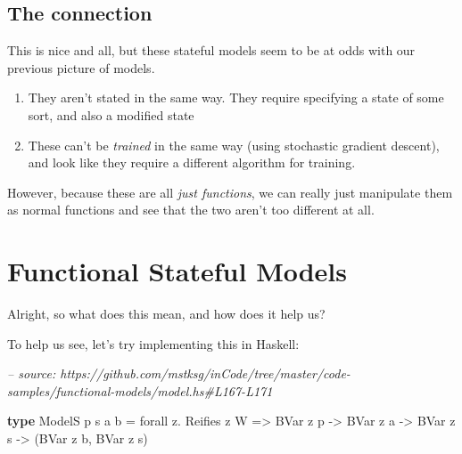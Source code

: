 \documentclass[]{article}
\newenvironment{Shaded}{}{}
\newcommand{\CommentTok}[1]{\textcolor[rgb]{0.38,0.63,0.69}{\textit{#1}}}
\newcommand{\DataTypeTok}[1]{\textcolor[rgb]{0.56,0.13,0.00}{#1}}
\newcommand{\FunctionTok}[1]{\textcolor[rgb]{0.02,0.16,0.49}{#1}}
\newcommand{\KeywordTok}[1]{\textcolor[rgb]{0.00,0.44,0.13}{\textbf{#1}}}
\newcommand{\NormalTok}[1]{#1}
\newcommand{\OtherTok}[1]{\textcolor[rgb]{0.00,0.44,0.13}{#1}}
\begin{document}
\hypertarget{the-connection}{%
\subsection{The connection}\label{the-connection}}

This is nice and all, but these stateful models seem to be at odds with our
previous picture of models.

\begin{enumerate}
\def\labelenumi{\arabic{enumi}.}
\tightlist
\item
  They aren't stated in the same way. They require specifying a state of some
  sort, and also a modified state
\item
  These can't be \emph{trained} in the same way (using stochastic gradient
  descent), and look like they require a different algorithm for training.
\end{enumerate}

However, because these are all \emph{just functions}, we can really just
manipulate them as normal functions and see that the two aren't too different at
all.

\hypertarget{functional-stateful-models}{%
\section{Functional Stateful Models}\label{functional-stateful-models}}

Alright, so what does this mean, and how does it help us?

To help us see, let's try implementing this in Haskell:

\begin{Shaded}
\begin{Highlighting}[]
\CommentTok{-- source: https://github.com/mstksg/inCode/tree/master/code-samples/functional-models/model.hs#L167-L171}

\KeywordTok{type} \DataTypeTok{ModelS}\NormalTok{ p s a b }\FunctionTok{=}\NormalTok{ forall z}\FunctionTok{.} \DataTypeTok{Reifies}\NormalTok{ z }\DataTypeTok{W}
                   \OtherTok{=>} \DataTypeTok{BVar}\NormalTok{ z p}
                   \OtherTok{->} \DataTypeTok{BVar}\NormalTok{ z a}
                   \OtherTok{->} \DataTypeTok{BVar}\NormalTok{ z s}
                   \OtherTok{->}\NormalTok{ (}\DataTypeTok{BVar}\NormalTok{ z b, }\DataTypeTok{BVar}\NormalTok{ z s)}
\end{Highlighting}
\end{Shaded}
\end{document}
